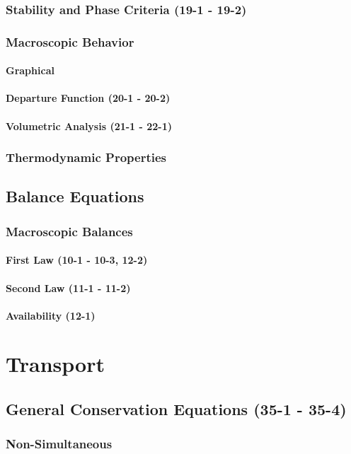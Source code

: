 \documentclass{report}
\begin{document}
\subsection{Stability and Phase Criteria (19-1 - 19-2)}
\subsection{Macroscopic Behavior}
\subsubsection{Graphical}
\subsubsection{Departure Function (20-1 - 20-2)}
\subsubsection{Volumetric Analysis (21-1 - 22-1)}
\subsection{Thermodynamic Properties}
\section{Balance Equations}
\subsection{Macroscopic Balances}
\subsubsection{First Law (10-1 - 10-3, 12-2)}
\subsubsection{Second Law (11-1 - 11-2)}
\subsubsection{Availability (12-1)}
\chapter{Transport}
\section{General Conservation Equations (35-1 - 35-4)}
\subsection{Non-Simultaneous}
\end{document}
